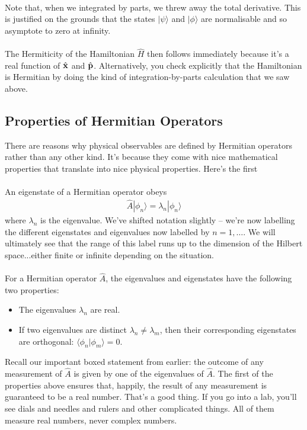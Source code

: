 \documentclass[12pt]{article}
\def\be{\begin{eqnarray}}
\def\ee{\end{eqnarray}}
\newcommand{\nn}{\nonumber}
\newcommand\para{\paragraph{}}
\newcommand{\ket}[1]{|#1\rangle}
\newcommand{\bra}[1]{\langle#1|}
\newcommand{\co}{\color{olive}}
\newcommand{\bx}{{\bf x}}
\newcommand{\bp}{{\bf p}}
\begin{document}
{\para
Note that, when we integrated by parts, we threw away the total derivative. This is justified on the grounds that the states $\ket{\psi}$ and $\ket{\phi}$ are normalisable and so asymptote to zero at infinity. 

\para
The Hermiticity  of the Hamiltonian $\hat{H}$ then follows immediately  because it's a real function of $\hat{\bx}$ and $\hat{\bp}$. Alternatively, you check explicitly that the Hamiltonian is Hermitian by doing the kind of integration-by-parts calculation that we saw above.




\subsection{Properties of Hermitian Operators}


There are reasons why physical observables are defined by Hermitian operators rather than any other kind. It's because they come with nice mathematical properties that translate into nice physical properties.  Here's the first

\para
{\co  An eigenstate of a Hermitian operator obeys
%
\be \hat{A}\ket{\phi_n} = \lambda_n\ket{\phi_n}\nn\ee
%
where $\lambda_n$ is the eigenvalue.} We've shifted notation slightly -- we're now labelling the different eigenstates and eigenvalues now labelled by $n=1,\ldots$. We will ultimately see that the range of this label runs up to the dimension of the Hilbert space...either finite or infinite depending on the situation. 

\para
{\co For a Hermitian operator $\hat{A}$, the eigenvalues and eigenstates have the following two properties:
%
\begin{itemize}
\item The eigenvalues $\lambda_n$ are real.  \vskip 3mm
\item If two eigenvalues are distinct $\lambda_n\neq \lambda_m$, then their corresponding eigenstates are orthogonal: $\bra{\phi_n}{\phi_m}\rangle=0$. 
\end{itemize}
%
}
Recall our important boxed statement from earlier: the outcome of any measurement of $\hat{A}$ is given by one of the eigenvalues of $\hat{A}$. The first of the properties above ensures that, happily, the result of any measurement is guaranteed to be  a real number. That's a good thing. If you go into a lab, you'll see dials and needles and rulers and other complicated things. All of them measure real numbers, never complex numbers.


}
\end{document}

